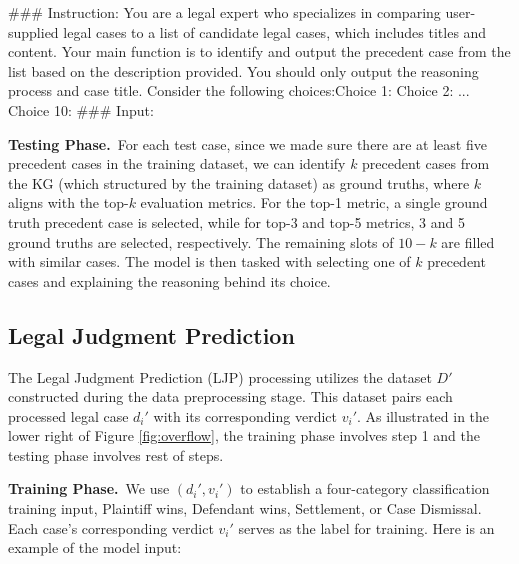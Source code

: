 \begin{formal}
\#\#\# Instruction:\newline
You are a legal expert who specializes in comparing user-supplied legal cases to a list of candidate legal cases, which includes titles and content. Your main function is to identify and output the precedent case from the list based on the description provided. \newline
You should only output the reasoning process and case title. \newline
Consider the following choices:\newline Choice 1: \newline [Case 1...] \newline Choice 2: \newline ... \newline  Choice 10: \newline [Case 10...]\newline
\#\#\# Input:
\end{formal}

\vspace{3pt}\noindent\textbf{Testing Phase.}\, For each test case, since we made sure there are at least five precedent cases in the training dataset, we can identify $k$ precedent cases from the KG (which structured by the training dataset) as ground truths, where $k$ aligns with the top-$k$ evaluation metrics. For the top-1 metric, a single ground truth precedent case is selected, while for top-3 and top-5 metrics, 3 and 5 ground truths are selected, respectively. The remaining slots of $10 - k$ are filled with similar cases. The model is then tasked with selecting one of $k$ precedent cases and explaining the reasoning behind its choice.

\subsection{Legal Judgment Prediction}

The Legal Judgment Prediction (LJP) processing utilizes the dataset \(D'\) constructed during the data preprocessing stage. This dataset pairs each processed legal case \(d_i'\) with its corresponding verdict \(v_i'\). As illustrated in the lower right of Figure \ref{fig:overflow}, the training phase involves step 1 and the testing phase involves rest of steps.

\vspace{3pt}\noindent\textbf{Training Phase.}\, We use $\left( d_i', v_i' \right)$ to establish a four-category classification training input, Plaintiff wins, Defendant wins, Settlement, or Case Dismissal. Each case's corresponding verdict \(v_i'\) serves as the label for training. Here is an example of the model input:

